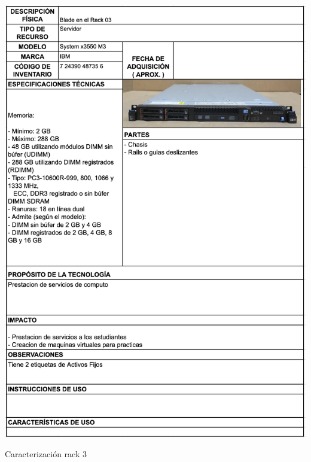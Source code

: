 \begin{table}[H]
    \centering
    \includegraphics[width=\textwidth]{tablas-images/cp1/racks/rack-3.png}
    \caption{Caracterización rack 3}\label{tab:rack-3}
\end{table}

